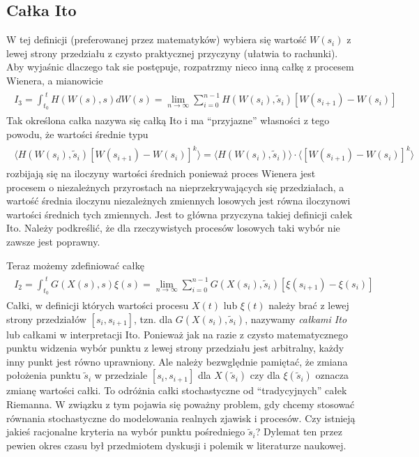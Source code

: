 \documentclass[a4paper,12pt,polish]{sphinxmanual}
\begin{document}
\subsection{Całka Ito}
\label{ch3/chIII011:calka-ito}
W tej definicji (preferowanej przez matematyków) wybiera się wartość $W(s_i)$ z lewej strony przedziału z czysto praktycznej przyczyny (ułatwia to rachunki). Aby wyjaśnic dlaczego tak sie postępuje, rozpatrzmy nieco inną całkę z procesem Wienera, a mianowicie
\label{ch3/chIII011:equation-eqn20}\begin{gather}
\begin{split}I_3= \int_{t_0}^{\;t} H(W(s), s) dW(s) = \lim_{n \to \infty} \sum_{i=0}^{n-1} H(W(s_i), {\tilde s}_i) [W(s_{i+1}) -W(s_i)]\end{split}\label{ch3/chIII011-eqn20}
\end{gather}
Tak określona całka nazywa się całką Ito i ma ``przyjazne'' własności z tego powodu, że wartości średnie typu
\label{ch3/chIII011:equation-eqn21}\begin{gather}
\begin{split} \langle H(W(s_i), {\tilde s}_i) [W(s_{i+1}) -W(s_i)]^k\rangle = \langle H(W(s_i), {\tilde s}_i)\rangle \cdot \langle [W(s_{i+1}) -W(s_i)]^k\rangle\end{split}\label{ch3/chIII011-eqn21}
\end{gather}
rozbijają się na iloczyny wartości średnich ponieważ proces Wienera jest procesem o niezależnych przyrostach na nieprzekrywających się przedziałach, a wartość średnia iloczynu niezależnych zmiennych losowych jest równa iloczynowi wartości średnich tych zmiennych. Jest to główna przyczyna takiej definicji całek Ito. Należy podkreślić, że dla rzeczywistych procesów losowych taki wybór nie zawsze jest poprawny.

Teraz możemy zdefiniować całkę
\label{ch3/chIII011:equation-eqn22}\begin{gather}
\begin{split}I_2=\int_{t_0}^{\;t} G(X(s), s) \xi(s) = \lim_{n \to \infty} \sum_{i=0}^{n-1} G(X(s_i), {\tilde s}_i) [\xi(s_{i+1}) -\xi(s_i)]\end{split}\label{ch3/chIII011-eqn22}
\end{gather}
Całki, w definicji których wartości procesu $X(t)$ lub $\xi(t)$ należy brać z lewej strony przedziałów $[s_i, s_{i+1}]$, tzn. dla $G(X(s_i), {\tilde s}_i)$, nazywamy \emph{całkami Ito} lub całkami w interpretacji Ito. Ponieważ jak na razie z czysto matematycznego punktu widzenia wybór punktu z lewej strony przedziału jest arbitralny, każdy inny punkt jest równo uprawniony. Ale należy bezwględnie pamiętać, że zmiana położenia punktu ${\tilde s}_i$ w przedziale $[s_i, s_{i+1}]$ dla $X(\tilde s_i)$ czy dla $\xi(\tilde s_i)$ oznacza zmianę wartości całki. To odróżnia całki stochastyczne od ``tradycyjnych'' całek Riemanna. W związku z tym pojawia się poważny problem, gdy chcemy stosować równania stochastyczne do modelowania realnych zjawisk i procesów. Czy istnieją jakieś racjonalne kryteria na wybór punktu pośredniego $\tilde s_i$? Dylemat ten przez pewien okres czasu był przedmiotem dyskusji i polemik w literaturze naukowej.
\end{document}
